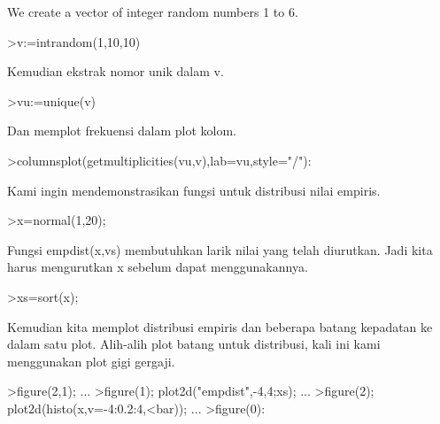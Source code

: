 \documentclass[12pt,arial,letterpaper]{book}
\begin{document}
\begin{eulernootebook}
\begin{eulercomment}
\begin{eulercomment}
\begin{eulernootebook}
\begin{eulercomment}
\begin{eulercomment}
\begin{eulercomment}
\begin{eulercomment}
\begin{eulercomment}
\begin{eulercomment}
\begin{eulercomment}
\begin{eulercomment}
We create a vector of integer random numbers 1 to 6.
\end{eulercomment}
\begin{eulerprompt}
>v:=intrandom(1,10,10)
\end{eulerprompt}
\begin{euleroutput}
  [8,  5,  8,  8,  6,  8,  8,  3,  5,  5]
\end{euleroutput}
\begin{eulercomment}
Kemudian ekstrak nomor unik dalam v.
\end{eulercomment}
\begin{eulerprompt}
>vu:=unique(v)
\end{eulerprompt}
\begin{euleroutput}
  [3,  5,  6,  8]
\end{euleroutput}
\begin{eulercomment}
Dan memplot frekuensi dalam plot kolom.
\end{eulercomment}
\begin{eulerprompt}
>columnsplot(getmultiplicities(vu,v),lab=vu,style="/"):
\end{eulerprompt}
\begin{eulercomment}
Kami ingin mendemonstrasikan fungsi untuk distribusi nilai empiris.
\end{eulercomment}
\begin{eulerprompt}
>x=normal(1,20);
\end{eulerprompt}
\begin{eulercomment}
Fungsi empdist(x,vs) membutuhkan larik nilai yang telah diurutkan.
Jadi kita harus mengurutkan x sebelum dapat menggunakannya.
\end{eulercomment}
\begin{eulerprompt}
>xs=sort(x);
\end{eulerprompt}
\begin{eulercomment}
Kemudian kita memplot distribusi empiris dan beberapa batang kepadatan
ke dalam satu plot. Alih-alih plot batang untuk distribusi, kali ini
kami menggunakan plot gigi gergaji.
\end{eulercomment}
\begin{eulerprompt}
>figure(2,1); ...
>figure(1); plot2d("empdist",-4,4;xs); ...
>figure(2); plot2d(histo(x,v=-4:0.2:4,<bar));  ...
>figure(0):
\end{eulerprompt}

\end{eulercomment}
\end{eulercomment}
\end{eulercomment}
\end{eulercomment}
\end{eulercomment}
\end{eulercomment}
\end{eulercomment}
\end{eulernootebook}
\end{eulercomment}
\end{eulercomment}
\end{eulernootebook}
\end{document}

